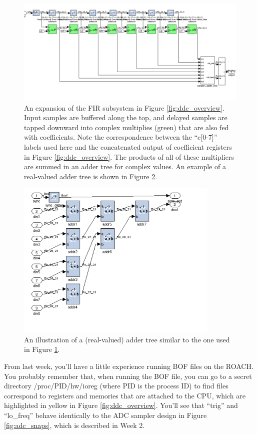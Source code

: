 \documentclass[11pt]{article}
\begin{document}
\begin{figure}\centering
\includegraphics[width=6in]{plots/fir_subsystem.png}
\caption{
An expansion of the FIR subsystem in Figure \ref{fig:ddc_overview}.
Input samples are buffered along the top, and delayed samples are tapped 
downward into complex multiplies (green) that are also fed with coefficients.
Note the correspondence between the ``c[0-7]'' labels used here and the 
concatenated output of coefficient registers in Figure \ref{fig:ddc_overview}.
The products of all of these multipliers are summed in an adder tree
for complex values.  An example of a real-valued adder tree is shown in Figure \ref{fig:adder_tree}.
} \label{fig:fir_subsystem}
\end{figure}

\begin{figure}\centering
\includegraphics[height=3in]{plots/adder_tree.png}
\caption{
An illustration of a (real-valued) adder tree similar to the one used
in Figure \ref{fig:fir_subsystem}.
} \label{fig:adder_tree}
\end{figure}

From last week, you'll have a little experience running BOF files on the ROACH.  You probably
remember that, when running the BOF file, you can go to a secret directory 
/proc/PID/hw/ioreg (where PID is the process ID) to find
files correspond to registers and memories that are attached to the CPU, which are highlighted
in yellow in Figure \ref{fig:ddc_overview}.
You'll see that ``trig'' and ``lo\_freq'' behave identically to the ADC sampler design
in Figure \ref{fig:adc_snaps}, which is described in Week 2.
\end{document}
